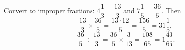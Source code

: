 Convert to improper fractions: $4\dfrac13=\dfrac{13}3$ and $7\dfrac15=\dfrac{36}5$. Then
\[\dfrac{13}3\times\dfrac{36}5=\dfrac{13\cdot12}{5}=\boxed{\dfrac{156}5=31\dfrac15},\]
\[\dfrac{36}5\div\dfrac{13}3=\dfrac{36}5\times\dfrac3{13}=\boxed{\dfrac{108}{65}=1\dfrac{43}{65}}.\]
